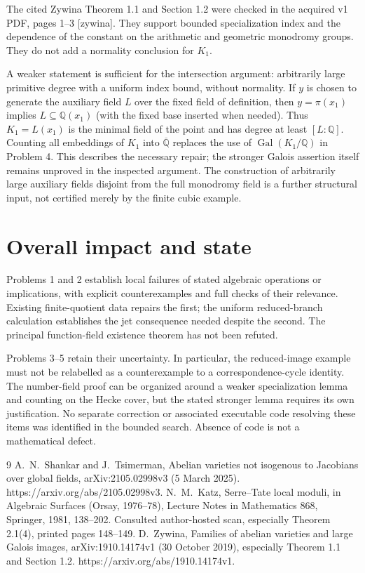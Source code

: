 \documentclass[10pt]{article}
\begin{document}
The cited Zywina Theorem 1.1 and Section 1.2 were checked in the acquired v1 PDF, pages 1–3 [zywina]. They support bounded specialization index and the dependence of the constant on the arithmetic and geometric monodromy groups. They do not add a normality conclusion for \(K_1\).\par
A weaker statement is sufficient for the intersection argument: arbitrarily large primitive degree with a uniform index bound, without normality. If \(y\) is chosen to generate the auxiliary field \(L\) over the fixed field of definition, then \(y=\pi(x_1)\) implies \(L\subseteq\mathbb Q(x_1)\) (with the fixed base inserted when needed). Thus \(K_1=L(x_1)\) is the minimal field of the point and has degree at least \([L:\mathbb Q]\). Counting all embeddings of \(K_1\) into \(\overline{\mathbb Q}\) replaces the use of \(\operatorname{Gal}(K_1/\mathbb Q)\) in Problem 4. This describes the necessary repair; the stronger Galois assertion itself remains unproved in the inspected argument. The construction of arbitrarily large auxiliary fields disjoint from the full monodromy field is a further structural input, not certified merely by the finite cubic example.\par
\section*{Overall impact and state}
Problems 1 and 2 establish local failures of stated algebraic operations or implications, with explicit counterexamples and full checks of their relevance. Existing finite-quotient data repairs the first; the uniform reduced-branch calculation establishes the jet consequence needed despite the second. The principal function-field existence theorem has not been refuted.\par
Problems 3–5 retain their uncertainty. In particular, the reduced-image example must not be relabelled as a counterexample to a correspondence-cycle identity. The number-field proof can be organized around a weaker specialization lemma and counting on the Hecke cover, but the stated stronger lemma requires its own justification. No separate correction or associated executable code resolving these items was identified in the bounded search. Absence of code is not a mathematical defect.\par
9 A. N. Shankar and J. Tsimerman, Abelian varieties not isogenous to Jacobians over global fields, arXiv:2105.02998v3 (5 March 2025). https://arxiv.org/abs/2105.02998v3. N. M. Katz, Serre–Tate local moduli, in Algebraic Surfaces (Orsay, 1976–78), Lecture Notes in Mathematics 868, Springer, 1981, 138–202. Consulted author-hosted scan, especially Theorem 2.1(4), printed pages 148–149. D. Zywina, Families of abelian varieties and large Galois images, arXiv:1910.14174v1 (30 October 2019), especially Theorem 1.1 and Section 1.2. https://arxiv.org/abs/1910.14174v1.\par
\end{document}
